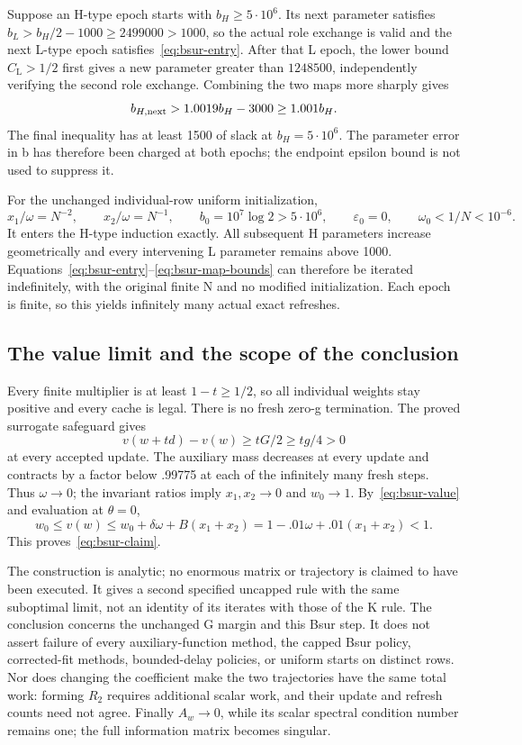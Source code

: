 Suppose an H-type epoch starts with $b_H\ge5\cdot10^6$. Its next parameter
satisfies $b_L>b_H/2-1000\ge2499000>1000$, so the actual role exchange is
valid and the next L-type epoch satisfies~\eqref{eq:bsur-entry}.
After that L epoch, the lower bound $C_{\mathrm L}>1/2$ first gives a new
parameter greater than $1248500$, independently verifying the second role
exchange. Combining the two maps more sharply gives
\begin{equation}\label{eq:bsur-global-induction}
 b_{H,\rm next}>1.0019b_H-3000\ge1.001b_H.
\end{equation}
The final inequality has at least 1500 of slack at $b_H=5\cdot10^6$.
The parameter error in b has therefore been charged at both epochs; the
endpoint epsilon bound is not used to suppress it.

For the unchanged individual-row uniform initialization,
\[
 x_1/\omega=N^{-2},\qquad x_2/\omega=N^{-1},\qquad
 b_0=10^7\log2>5\cdot10^6,\qquad
 \varepsilon_0=0,\qquad \omega_0<1/N<10^{-6}.
\]
It enters the H-type induction exactly. All subsequent H parameters increase
geometrically and every intervening L parameter remains above 1000.
Equations~\eqref{eq:bsur-entry}--\eqref{eq:bsur-map-bounds} can therefore be
iterated indefinitely, with the original finite N and no modified initialization.
Each epoch is finite, so this yields infinitely many actual exact refreshes.

\subsection{The value limit and the scope of the conclusion}
\label{sec:bsur-conclusion}

Every finite multiplier is at least $1-t\ge1/2$, so all individual weights stay
positive and every cache is legal. There is no fresh zero-g termination.
The proved surrogate safeguard gives
\[
 v(w+td)-v(w)\ge tG/2\ge tg/4>0
\]
at every accepted update. The auxiliary mass decreases at every update and
contracts by a factor below .99775 at each of the infinitely many fresh steps.
Thus $\omega\to0$; the invariant ratios imply $x_1,x_2\to0$ and $w_0\to1$.
By~\eqref{eq:bsur-value} and evaluation at $\theta=0$,
\[
 w_0\le v(w)\le w_0+\delta\omega+B(x_1+x_2)
 =1-.01\omega+.01(x_1+x_2)<1.
\]
This proves~\eqref{eq:bsur-claim}.

The construction is analytic; no enormous matrix or trajectory is claimed to
have been executed. It gives a second specified uncapped rule with the same
suboptimal limit, not an identity of its iterates with those of the K rule.
The conclusion concerns the unchanged G margin and this Bsur step. It does not
assert failure of every auxiliary-function method, the capped Bsur policy,
corrected-fit methods, bounded-delay policies, or uniform starts on distinct
rows. Nor does changing the coefficient make the two trajectories have the same
total work: forming $R_2$ requires additional scalar work, and their update and
refresh counts need not agree. Finally $A_w\to0$, while its scalar spectral
condition number remains one; the full information matrix becomes singular.

